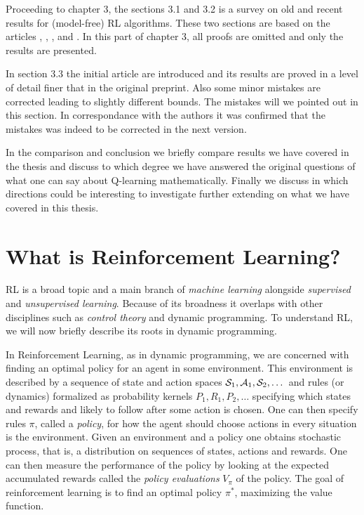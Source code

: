 Proceeding to chapter 3, the sections 3.1 and 3.2 is a survey on old and
recent results for (model-free) RL algorithms. These two sections are based
on the articles , , , 
and .
In this part of chapter 3, all proofs are omitted and only the results
are presented.

In section 3.3 the initial article  are introduced
and its results are proved in a level of detail finer that in the original
preprint. Also some minor mistakes are corrected leading to slightly
different bounds. The mistakes will we pointed out in this section.
In correspondance with the authors it was confirmed that the
mistakes was indeed to be corrected in the next version.

In the comparison and conclusion we briefly compare results we have covered
in the thesis and discuss to which degree we have answered the original
questions of what one can say about Q-learning mathematically.
Finally we discuss in which directions could be interesting to
investigate further extending on what we have covered in this thesis.

\section{What is Reinforcement Learning?}

RL is a broad topic and a main branch of
\emph{machine learning} alongside \emph{supervised} and \emph{unsupervised
learning}. Because of its broadness it overlaps with other disciplines
such as \emph{control theory} and dynamic programming.
To understand RL, we will now briefly describe its roots in dynamic programming.

In Reinforcement Learning, as in dynamic programming,
we are concerned with finding an optimal policy
for an agent in some environment.
This environment is described by
a sequence of state and action spaces
$\mathcal{S}_1, \mathcal{A}_1, \mathcal{S}_2, \dots$
and rules (or dynamics) formalized as probability kernels
$P_1, R_1, P_2, \dots$ specifying which states and rewards
and likely to follow after some action is chosen.
One can then specify rules $\pi$, called a \emph{policy},
for how the agent should choose actions in every situation is the environment.
Given an environment and a policy one obtains stochastic process,
that is, a distribution on sequences of states, actions and
rewards.
One can then measure the performance of the policy by looking at
the expected accumulated rewards called the \emph{policy evaluations}
$V_\pi$ of the policy.
The goal of reinforcement learning is to find an optimal policy $\pi^*$,
maximizing the value function.

